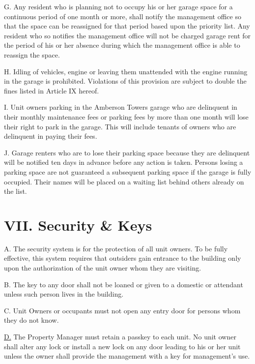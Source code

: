 \documentclass[
]{book}
\begin{document}
G. Any resident who is planning not to occupy his or her garage space for a continuous period of one month or more, shall notify the management office so that the space can be reassigned for that period based upon the priority list. Any resident who so notifies the management office will not be charged garage rent for the period of his or her absence during which the management office is able to reassign the space.

H. Idling of vehicles, engine or leaving them unattended with the engine running in the garage is prohibited. Violations of this provision are subject to double the fines listed in Article IX hereof.

I. Unit owners parking in the Amberson Towers garage who are delinquent in their monthly maintenance fees or parking fees by more than one month will lose their right to park in the garage. This will include tenants of owners who are delinquent in paying their fees.

J. Garage renters who are to lose their parking space because they are delinquent will be notified ten days in advance before any action is taken. Persons losing a parking space are not guaranteed a subsequent parking space if the garage is fully occupied. Their names will be placed on a waiting list behind others already on the list.

\hypertarget{vii.-security-keys}{%
\section*{VII. Security \& Keys}\label{vii.-security-keys}}

A. The security system is for the protection of all unit owners. To be fully effective, this system requires that outsiders gain entrance to the building only upon the authorization of the unit owner whom they are visiting.

B. The key to any door shall not be loaned or given to a domestic or attendant unless such person lives in the building.

C. Unit Owners or occupants must not open any entry door for persons whom they do not know.

\protect\hyperlink{Sect4D}{D.} The Property Manager must retain a passkey to each unit. No unit owner shall alter any lock or install a new lock on any door leading to his or her unit unless the owner shall provide the management with a key for management's use.
\end{document}
